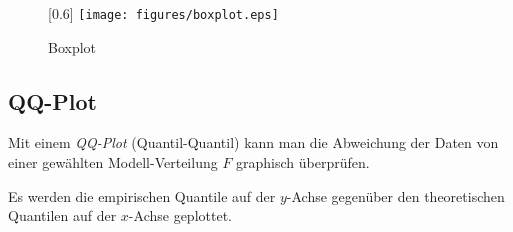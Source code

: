 \begin{figure}[htb]
	\begin{center}
		\scalebox{0.6}[0.6]{
			\texttt{[image: figures/boxplot.eps]}}
	\end{center}
	\vspace{-3em}
	\caption{Boxplot}
\end{figure}




\subsection{QQ-Plot}

Mit einem \emph{QQ-Plot} (Quantil-Quantil) kann man die Abweichung der Daten von einer gewählten Modell-Verteilung \(F\) graphisch überprüfen.

Es werden die empirischen Quantile auf der \(y\)-Achse gegenüber den theoretischen Quantilen auf der \(x\)-Achse geplottet.
